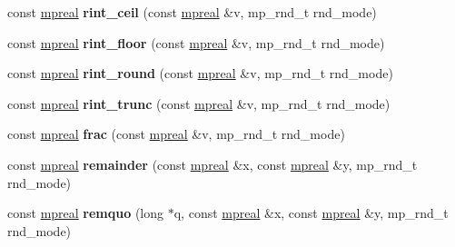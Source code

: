 \begin{DoxyCompactItemize}
\mbox{\label{classmpfr_1_1mpreal_aa44ebf279be721c35d7231d6d0e0f1f6}} 
const \hyperlink{classmpfr_1_1mpreal}{mpreal} {\bfseries rint\+\_\+ceil} (const \hyperlink{classmpfr_1_1mpreal}{mpreal} \&v, mp\+\_\+rnd\+\_\+t rnd\+\_\+mode)
\item 
\mbox{\label{classmpfr_1_1mpreal_a7d761a988ccde66b0680ea36579731b2}} 
const \hyperlink{classmpfr_1_1mpreal}{mpreal} {\bfseries rint\+\_\+floor} (const \hyperlink{classmpfr_1_1mpreal}{mpreal} \&v, mp\+\_\+rnd\+\_\+t rnd\+\_\+mode)
\item 
\mbox{\label{classmpfr_1_1mpreal_ac96e8d5959c0bb72e2df4ac8fd08854f}} 
const \hyperlink{classmpfr_1_1mpreal}{mpreal} {\bfseries rint\+\_\+round} (const \hyperlink{classmpfr_1_1mpreal}{mpreal} \&v, mp\+\_\+rnd\+\_\+t rnd\+\_\+mode)
\item 
\mbox{\label{classmpfr_1_1mpreal_a0eff17a5c603b822fdb63e59ebb730c7}} 
const \hyperlink{classmpfr_1_1mpreal}{mpreal} {\bfseries rint\+\_\+trunc} (const \hyperlink{classmpfr_1_1mpreal}{mpreal} \&v, mp\+\_\+rnd\+\_\+t rnd\+\_\+mode)
\item 
\mbox{\label{classmpfr_1_1mpreal_a7fe97c8636a036f36cb1e98f782bf287}} 
const \hyperlink{classmpfr_1_1mpreal}{mpreal} {\bfseries frac} (const \hyperlink{classmpfr_1_1mpreal}{mpreal} \&v, mp\+\_\+rnd\+\_\+t rnd\+\_\+mode)
\item 
\mbox{\label{classmpfr_1_1mpreal_aca7d313d777a289692f4d0f73ae09018}} 
const \hyperlink{classmpfr_1_1mpreal}{mpreal} {\bfseries remainder} (const \hyperlink{classmpfr_1_1mpreal}{mpreal} \&x, const \hyperlink{classmpfr_1_1mpreal}{mpreal} \&y, mp\+\_\+rnd\+\_\+t rnd\+\_\+mode)
\item 
\mbox{\label{classmpfr_1_1mpreal_a8a3fcae18c5f636c8a4c6341100ef8b3}} 
const \hyperlink{classmpfr_1_1mpreal}{mpreal} {\bfseries remquo} (long $\ast$q, const \hyperlink{classmpfr_1_1mpreal}{mpreal} \&x, const \hyperlink{classmpfr_1_1mpreal}{mpreal} \&y, mp\+\_\+rnd\+\_\+t rnd\+\_\+mode)
\item 
\mbox{\label{classmpfr_1_1mpreal_af8811247fd961a5944f02d33dd349953}} 

\end{DoxyCompactItemize}
